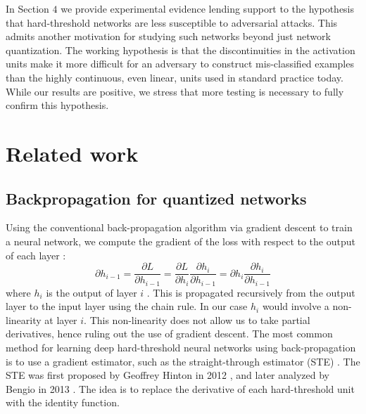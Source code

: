 In Section $4$ we provide experimental evidence lending support to the hypothesis that hard-threshold networks are less susceptible to adversarial attacks. This admits another motivation for studying such networks beyond just network quantization. The working hypothesis is that the discontinuities in the activation units make it more difficult for an adversary to construct mis-classified examples than the highly continuous, even linear, units used in standard practice today. While our results are positive, we stress that more testing is necessary to fully confirm this hypothesis. 


\section{Related work}
\label{S:2}

\subsection{Backpropagation for quantized networks}

Using the conventional back-propagation algorithm via gradient descent to train a neural network, we compute the gradient of the loss with respect to the output of each layer : $$\partial h_{i-1}=\frac{\partial L}{\partial h_{i-1}}=\frac{\partial L}{\partial h_i}\frac{\partial h_i}{\partial h_{i-1}}=\partial h_i \frac{\partial h_i}{\partial h_{i-1}}$$ where $h_i$ is the output of layer $i$ \cite{lee2015difference}. This is propagated recursively from the output layer to the input layer using the chain rule. In our case $h_i$ would involve a non-linearity at layer $i$. This non-linearity does not allow us to take partial derivatives, hence ruling out the use of gradient descent. The most common method for learning deep hard-threshold neural networks using back-propagation is to use a gradient estimator, such as the straight-through estimator (STE) . The STE was first proposed by Geoffrey Hinton in 2012 \cite{hinton2012neural}, and later analyzed by Bengio in 2013 \cite{bengio2013estimating}. The idea is to replace the derivative of each hard-threshold unit with the identity function.\\

